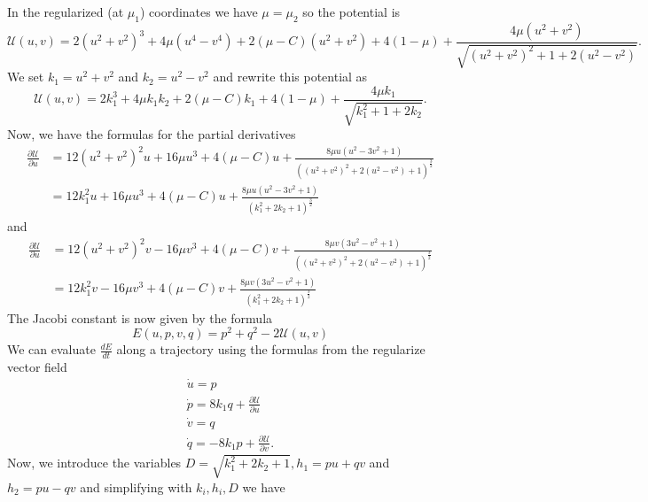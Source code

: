 \documentclass[10pt]{article}
\newcommand{\pardiff}[2]{\frac{\partial #1}{\partial #2}}
\begin{document}
In the regularized (at $\mu_1$) coordinates we have $\mu = \mu_2$ so the potential is 
\[
\mathcal{U}(u,v) =  2 \left( u^2 + v^2 \right)^3 + 4 \mu \left( u^4 - v^4 \right) + 2( \mu - C ) \left( u^2 + v^2 \right) + 4 ( 1 - \mu ) + \frac { 4 \mu \left( u^2 + v^2 \right) } { \sqrt { \left( u^2 + v^2 \right)^2 + 1 + 2 \left( u^2 - v^2 \right) } }.
\]
We set $k_1 = u^2 + v^2$ and $k_2 = u^2 - v^2$ and rewrite this potential as
\[
\mathcal{U}(u,v) =  2 k_1^ { 3 } + 4 \mu k_1k_2+ 2( \mu - C )k_1 + 4 ( 1 - \mu ) + \frac { 4 \mu k_1} { \sqrt { k_1^2 + 1 + 2 k_2 } }.
\]
Now, we have the formulas for the partial derivatives
\begin{align*}
	\pardiff{\mathcal{U}}{u} & = 12 {\left(u^{2} + v^{2}\right)}^{2} u +  16 \mu u^3 + 4  {\left(\mu - C \right)} u + \frac{8 \mu u (u^2-3v^2+1)}{{\left({\left(u^{2} + v^{2}\right)}^{2} + 2(u^2-v^2) + 1\right)}^{\frac{3}{2}}} \\
	& = 12k_1^2 u +  16 \mu u^3 + 4  {\left(\mu - C \right)} u + \frac{8 \mu u (u^2-3v^2+1)}{(k_1^2 + 2k_2 + 1)^{\frac{3}{2}}} 
\end{align*}
and 
\begin{align*}
 \pardiff{\mathcal{U}}{u}  & = 12{\left(u^{2} + v^{2}\right)}^2 v - 16\mu v^3 + 4 {\left(\mu -C\right)} v  + 
 \frac{8 \mu v(3u^2 - v^2 +1)}{\left((u^2+v^2)^2 + 2(u^2-v^2) + 1 \right)^{\frac{3}{2}}} \\
 & = 12 k_1^2 v - 16 \mu v^3 + 4(\mu - C)v + \frac{8 \mu v(3u^2 - v^2 +1)}{(k_1^2 + 2k_2 + 1)^{\frac{3}{2}}} 
\end{align*}
The Jacobi constant is now given by the formula
\[
E(u,p,v,q) = p^2 + q^2 - 2\mathcal{U}(u,v) 
\]
We can evaluate $\frac{dE}{dt}$ along a trajectory using the formulas from the regularize vector field
\begin{eqnarray*}
\dot{u} = p \\
\dot{p} = 8k_1q + \pardiff{\mathcal{U}}{u} \\ 
\dot{v} = q \\
\dot{q} = -8k_1 p + \pardiff{\mathcal{U}}{v}.
\end{eqnarray*}
Now, we introduce the variables $D = \sqrt{k_1^2 + 2k_2 + 1}, h_1 = pu + qv$ and $h_2 = pu-qv$ and simplifying with $k_i,h_i,D$ we have 
\end{document}
